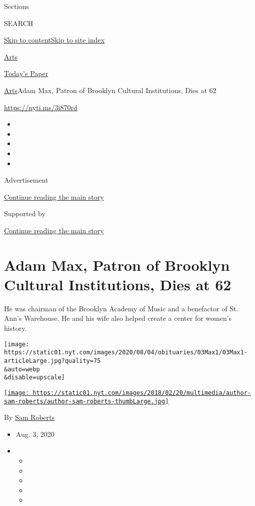 Sections

SEARCH

\protect\hyperlink{site-content}{Skip to
content}\protect\hyperlink{site-index}{Skip to site index}

\href{https://www.nytimes.com/section/arts}{Arts}

\href{https://myaccount.nytimes.com/auth/login?response_type=cookie\&client_id=vi}{}

\href{https://www.nytimes.com/section/todayspaper}{Today's Paper}

\href{/section/arts}{Arts}\textbar{}Adam Max, Patron of Brooklyn
Cultural Institutions, Dies at 62

\url{https://nyti.ms/3i870rd}

\begin{itemize}
\item
\item
\item
\item
\item
\end{itemize}

Advertisement

\protect\hyperlink{after-top}{Continue reading the main story}

Supported by

\protect\hyperlink{after-sponsor}{Continue reading the main story}

\hypertarget{adam-max-patron-of-brooklyn-cultural-institutions-dies-at-62}{%
\section{Adam Max, Patron of Brooklyn Cultural Institutions, Dies at
62}\label{adam-max-patron-of-brooklyn-cultural-institutions-dies-at-62}}

He was chairman of the Brooklyn Academy of Music and a benefactor of St.
Ann's Warehouse. He and his wife also helped create a center for women's
history.

\texttt{[image: https://static01.nyt.com/images/2020/08/04/obituaries/03Max1/03Max1-articleLarge.jpg?quality=75\\\&auto=webp\\\&disable=upscale]}

\href{https://www.nytimes.com/by/sam-roberts}{\texttt{[image: https://static01.nyt.com/images/2018/02/20/multimedia/author-sam-roberts/author-sam-roberts-thumbLarge.jpg]}}

By \href{https://www.nytimes.com/by/sam-roberts}{Sam Roberts}

\begin{itemize}
\item
  Aug. 3, 2020
\item
  \begin{itemize}
  \item
  \item
  \item
  \item
  \item
  \end{itemize}
\end{itemize}

